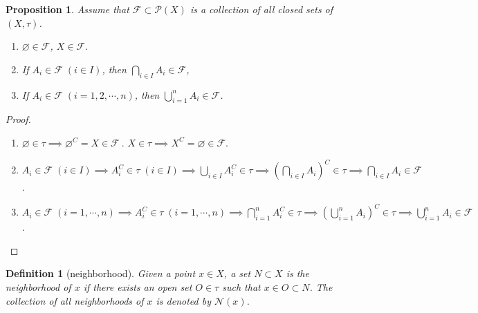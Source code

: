 \documentclass{report}
\newtheorem{definition}{Definition}[section]
\newtheorem{proposition}{Proposition}[section]
\theoremstyle{nonumberplain}
\newtheorem{proof}{Proof.}
\begin{document}
\begin{proposition}
	Assume that $\mathcal{F}\subset\mathcal{P}(X)$ is a collection of all closed sets of $(X,\tau)$.
	\begin{enumerate}	
	\item $\varnothing\in \mathcal{F}$, $X\in \mathcal{F}$.	
	\item If $A_i\in\mathcal{F}\;(i\in I)$, then $\bigcap\limits_{i\in I}A_i\in \mathcal{F}$, 
	\item If $A_i\in\mathcal{F}\;(i=1,2,\cdots,n)$, then $\bigcup\limits_{i=1}^nA_i\in \mathcal{F}$.
	\end{enumerate}
\end{proposition}
\begin{proof}~\\ 
	\begin{enumerate}	
		\item \vspace{-1em}$\varnothing\in \tau\implies\varnothing^C=X\in \mathcal{F} \ $. $X\in \tau\implies X^C=\varnothing\in \mathcal{F}$.	
		\item $A_i\in\mathcal{F}\;(i\in I)\implies A_i^C\in\tau\;(i\in I)\implies\bigcup\limits_{i\in I}A_i^C\in \tau\implies \left(\bigcap\limits_{i\in I}A_i\right)^C\in \tau\implies\bigcap\limits_{i\in I}A_i\in\mathcal{F}$. 
		\item $A_i\in\mathcal{F}\;(i=1,\cdots,n)\implies A_i^C\in\tau\;(i=1,\cdots,n)\implies\bigcap\limits_{i=1}^nA_i^C\in \tau\implies \left(\bigcup\limits_{i=1}^nA_i\right)^C\in \tau\implies\bigcup\limits_{i=1}^nA_i\in\mathcal{F}$.
	\end{enumerate}
\end{proof}

\begin{definition}[neighborhood]
Given a point $x\in X$, a set $N\subset X$ is the \emph{neighborhood} of $x$ if there exists an open set $O\in\tau$ such that $x\in O\subset N$. The collection of all neighborhoods of $x$ is denoted by $\mathcal{N}(x)$.
\end{definition}
\end{document}
